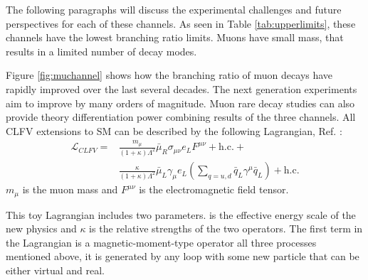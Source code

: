 The following paragraphs 
will discuss the experimental challenges and future perspectives for each of these channels. As seen in Table \ref{tab:upperlimits}, 
these channels have the lowest branching ratio limits. Muons have small mass, that results in a limited number of decay modes.


Figure \ref{fig:muchannel} 
shows how the branching ratio  of muon  decays
have rapidly improved over the last several decades. The next generation 
experiments aim to improve  by many orders of magnitude. Muon rare decay studies can also provide theory differentiation power 
combining results of the three channels. All CLFV extensions to SM can be described by the following Lagrangian, Ref. \cite{doi:10.1146/annurev-nucl-100809-131949}:
\begin{equation}\label{LCF}
\begin{aligned}
\mathscr{L}_{C L F V}= & \frac{m_\mu}{(1+\kappa) \Lambda^2} \bar{\mu}_R \sigma_{\mu \nu} e_L F^{\mu \nu}+\text{h.c.}+ \\
&\frac{\kappa}{(1+\kappa) \Lambda^2} \bar{\mu}_L \gamma_\mu e_L\left(\sum_{q=u, d} \bar{q}_L \gamma^\mu \bar{q}_L\right)+\text{h.c.}
\end{aligned}
\end{equation}
$m_\mu$ is the muon mass and  $F^{\mu \nu}$ is the electromagnetic field tensor.


This toy Lagrangian includes two parameters.
\del{$\Gamma$}\add{$\Lambda$} is the effective energy scale of the new physics and $\kappa$ is the relative strengths of the two operators. The first term in the Lagrangian 
is a magnetic-moment-type operator  all three processes mentioned above, it is generated by {\red any loop with some new particle that can be either virtual and real.}



